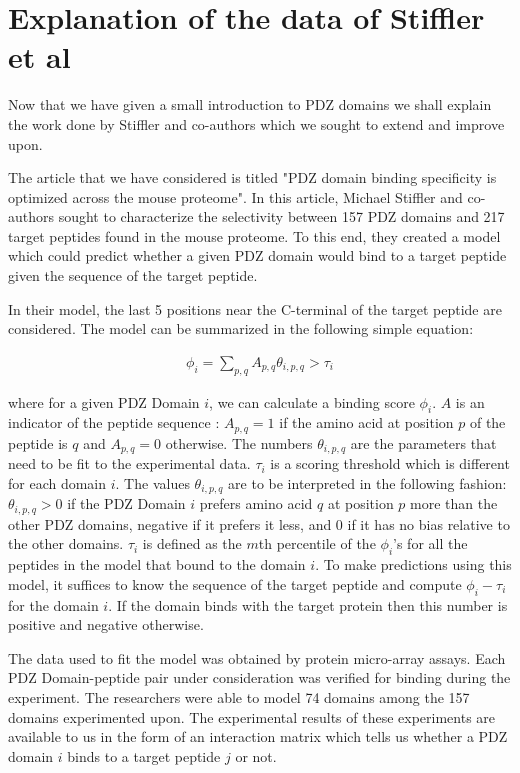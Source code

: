 \documentclass[a4paper, 12pt]{article}
\begin{document}
	\section{Explanation of the data of Stiffler et al}

	Now that we have given a small introduction to PDZ domains we shall explain the work done by Stiffler and co-authors which we sought to extend and improve upon.

	The article that we have considered is titled "PDZ domain binding specificity is optimized across the mouse proteome". In this article, Michael Stiffler and co-authors sought to characterize the selectivity between 157 PDZ domains and 217 target peptides found in the mouse proteome. To this end, they created a model which could predict whether a given PDZ domain would bind to a target peptide given the sequence of the target peptide.

	In their model, the last 5 positions near the C-terminal of the target peptide are considered. The model can be summarized in the following simple equation: 

	\begin{align}
	\label{model_base}
	\phi_{i} = \sum_{p,q} A_{p,q} \theta_{i,p,q} > \tau_{i}
	\end{align}

	where for a given PDZ Domain $i$, we can calculate a binding score $\phi_{i}$. $A$ is an indicator of the peptide sequence : $A_{p,q} =1$ if the amino acid at position $p$ of the peptide is $q$ and $A_{p,q} =0$ otherwise. The numbers $\theta_{i,p,q}$ are the parameters that need to be fit to the experimental data. $\tau_{i}$ is a scoring threshold which is different for each domain $i$. The values $\theta_{i,p,q}$ are to be interpreted in the following fashion: $\theta_{i,p,q} > 0$ if the PDZ Domain $i$ prefers amino acid $q$ at position $p$ more than the other PDZ domains, negative if it prefers it less, and 0 if it has no bias relative to the other domains. $\tau_{i}$ is defined as the $m$th percentile of the $\phi_{i}$'s for all the peptides in the model that bound to the domain $i$. To make predictions using this model, it suffices to know the sequence of the target peptide and compute $\phi_{i} - \tau_{i}$ for the domain $i$. If the domain binds with the target protein then this number is positive and negative otherwise. 

	The data used to fit the model was obtained by protein micro-array assays. Each PDZ Domain-peptide pair under consideration was verified for binding during the experiment. The researchers were able to model 74 domains among the 157 domains experimented upon. The experimental results of these experiments are available to us in the form of an interaction matrix which tells us whether a PDZ domain $i$ binds to a target peptide $j$ or not. 
\end{document}

